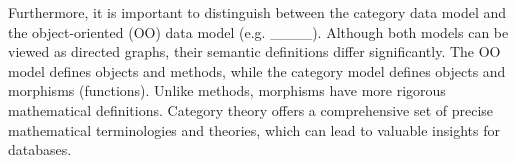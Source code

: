     Furthermore, it is important to distinguish between the category data model and the object-oriented (OO) data model (e.g. ____). Although both models can be viewed as directed graphs, their semantic definitions differ significantly. The OO model defines objects and methods, while the category model defines objects and morphisms (functions). Unlike methods, morphisms have more rigorous mathematical definitions. Category theory offers a comprehensive set of precise mathematical terminologies and theories, which can lead to valuable insights for databases.




